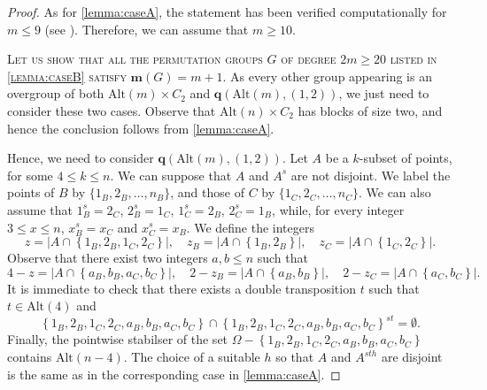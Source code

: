 \documentclass[a4paper]{amsart}
\newcommand{\Sym}{\mathrm{Sym}}
\newcommand{\Alt}{\mathrm{Alt}}
\newcommand{\m}{\mathbf{m}}
\newcommand{\qrk}{\mathbf{q}}
\theoremstyle{definition}
\begin{document}
\begin{proof}
    As for \cref{lemma:caseA}, the statement has been verified computationally for $m\le 9$ (see \cite{ourAlgorithm}). Therefore, we can assume that $m\ge 10$.

    \smallskip
    \noindent \textsc{Let us show that all the permutation groups $G$ of degree $2m\ge 20$
    listed in \cref{lemma:caseB} satisfy
    $\m(G) = m+1$.} As every other group appearing is an overgroup of both $\Alt(m) \times C_2$ and $\qrk(\Alt(m), (1,2))$, we just need to consider these two cases. Observe that $\Alt(n) \times C_2$ has blocks of size two, and hence the conclusion follows from \cref{lemma:caseA}.
    
    Hence, we need to consider $\qrk(\Alt(m), (1,2))$. Let $A$ be a $k$-subset of points, for some $4 \le k \le n$. We can suppose that $A$ and $A^s$ are not disjoint. We label the points of $B$ by $\{1_B, 2_B, \dots, n_B\}$, and those of $C$ by $\{1_C, 2_C, \dots, n_C\}$. We can also assume that $1_B^s = 2_C$, $2_B^s = 1_C$, $1_C^s = 2_B$, $2_C^s = 1_B$, while, for every integer $3\le x \le n$, $x_B^s=x_C$ and $x_C^s = x_B$. We define the integers
    \[ z = |A \cap \left\lbrace 1_B,2_B,1_C,2_C \right\rbrace|, \quad z_B = |A \cap \left\lbrace 1_B,2_B \right\rbrace|, \quad z_C = |A \cap \left\lbrace 1_C,2_C \right\rbrace|.\]
    Observe that there exist two integers $a,b \le n$ such that
    \[ 4-z = |A \cap \left\lbrace a_B,b_B,a_C,b_C \right\rbrace|, \quad 2-z_B = |A \cap \left\lbrace a_B,b_B \right\rbrace|, \quad 2-z_C = |A \cap \left\lbrace a_C,b_C \right\rbrace|. \]
    It is immediate to check that there exists a double transposition $t$ such that $t \in \Alt(4)$ and
    \[ \left\lbrace 1_B,2_B,1_C,2_C,a_B,b_B,a_C,b_C \right\rbrace \cap \left\lbrace 1_B,2_B,1_C,2_C,a_B,b_B,a_C,b_C \right\rbrace^{st} = \emptyset .\]
    Finally, the pointwise stabilser of the set $\Omega - \left\lbrace 1_B,2_B,1_C,2_C,a_B,b_B,a_C,b_C \right\rbrace$ contains $\Alt(n-4)$. The choice of a suitable $h$ so that $A$ and $A^{sth}$ are disjoint is the same as in the corresponding case in \cref{lemma:caseA}.%


\end{proof}
\end{document}
